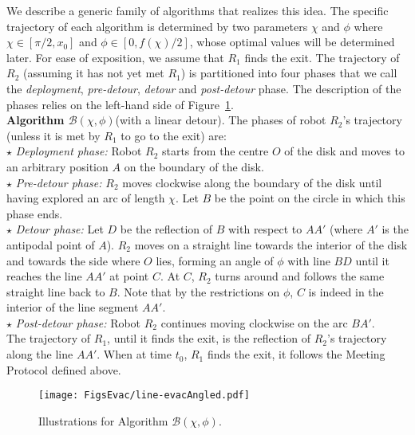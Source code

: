 \documentclass[
final
]{dmtcs-episciences}
\newcommand{\RA}{\ensuremath{R_1}}
\newcommand{\RB}{\ensuremath{R_2 }}
\theoremstyle{definition}
\begin{document}
We describe a generic family of algorithms that realizes this idea. The specific
trajectory of each algorithm is determined by two parameters $\chi$ and $\phi$  where $\chi \in [\pi/2,x_0]$ and $\phi \in [0, f(\chi)/2 ]$, whose optimal values will be determined later. 
For ease of exposition, we assume that $\RA$ finds the exit. The trajectory of $\RB$ (assuming it has not yet met $\RA$) is  
partitioned into four phases that we call the \textit{deployment}, \textit{pre-detour}, \textit{detour} and \textit{post-detour} phase. 
The description of the phases relies on the left-hand side of Figure~\ref{fig: line-evac New}.\\

\noindent
{\bf Algorithm $\mathcal B (\chi, \phi)$}(with a linear detour).  
The phases of robot $\RB$'s trajectory (unless it is met by $\RA$ to go to the exit) are: \\ $\star$ \textit{Deployment phase:} 
Robot $\RB$ starts from the centre $O$ of the disk and moves to an arbitrary position $A$ on the boundary of the disk. \\ $\star$ \textit{Pre-detour phase:} 
$\RB$ moves clockwise along the boundary of the disk until having explored an arc of length $\chi$. 
Let $B$ be the point on the circle in which this phase ends.\\
$\star$ \textit{Detour phase:}
Let $D$ be the reflection of $B$ with respect to $AA'$ (where $A'$ is the antipodal point of $A$). 
$\RB$ moves on a straight line towards the interior of the disk and towards the side where $O$ lies, 
forming an angle of $\phi$ with line $BD$ until it reaches the line $AA'$ at point $C$. 
At $C$, $\RB$ turns around and follows the same straight line back to $B$. 
Note that by the restrictions on $\phi$, $C$ is indeed in the interior of the line segment $AA'$. \\
$\star$ \textit{Post-detour phase:}
Robot $\RB$ continues moving clockwise on the arc $BA'$. \\[0.5ex]
The trajectory of $\RA$, until it finds the exit, is the reflection  
of \RB's trajectory along the line $AA'$.
 When at time $t_0$, $\RA$ finds the exit, it follows the Meeting Protocol defined above.\\




\begin{figure}[!ht]
                \centering
                \texttt{[image: FigsEvac/line-evacAngled.pdf]}
                \caption{Illustrations for Algorithm $\mathcal B(\chi, \phi)$. }
                \label{fig: line-evac New}
\end{figure}
\end{document}
